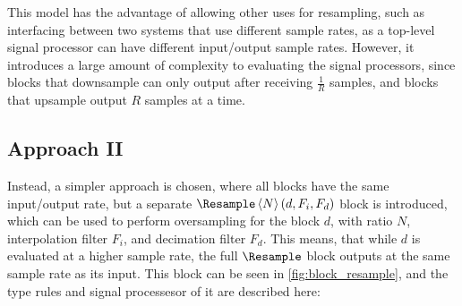This model has the advantage of allowing other uses for resampling, such as interfacing between two systems
that use different sample rates, as a top-level signal processor can have different input/output sample
rates. However, it introduces a large amount of complexity to evaluating the signal processors, since blocks
that downsample can only output after receiving $\frac 1 R$ samples, and blocks that upsample
output $R$ samples at a time.

\subsection{Approach II}
\label{sec:multirate_blocks_2}

Instead, a simpler approach is chosen, where all blocks have the same input/output rate, but a separate
$\Resample\left<N\right>(d, F_i, F_d)$ block is introduced, which can be used to perform oversampling for the block
$d$, with ratio $N$, interpolation filter $F_i$, and
decimation filter $F_d$. This means, that while $d$ is evaluated at a
higher sample rate, the full $\Resample$ block outputs at the same sample rate as its input. This
block can be seen in \autoref{fig:block_resample}, and the type rules and signal processesor of it are described
here:

\begin{prooftree}
\end{prooftree}

\begin{prooftree}
\end{prooftree}

